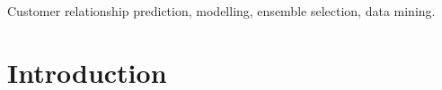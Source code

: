 \documentclass[journal]{IEEEtran}
\begin{document}
\begin{IEEEkeywords}
Customer relationship prediction, modelling, ensemble selection, data mining.
\end{IEEEkeywords}






%
\IEEEpeerreviewmaketitle



\section{Introduction}
%
%
%
%





\end{document}
